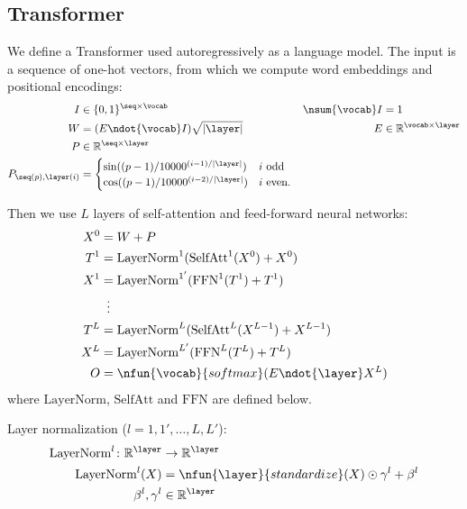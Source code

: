 \subsection{Transformer}
\label{sec:transformer}

We define a Transformer used autoregressively as a language model.
The input is a sequence of one-hot vectors, from which we compute word embeddings and positional encodings:
\begin{align*}
  I &\in \{0, 1\}^{\seq \times \vocab} & \nsum{\vocab} I &= 1 \\
  W &= (E \ndot{\vocab} I)\sqrt{|\layer|} & E &\in \reals^{\vocab \times \layer} \\
  P &\in \reals^{\seq \times \layer} \\
  P_{\seq(p), \layer(i)} &= \begin{cases}
    \sin((p-1) / 10000^{(i-1) / |\layer|}) & \text{$i$ odd} \\ 
    \cos((p-1) / 10000^{(i-2) / |\layer|}) & \text{$i$ even.}
  \end{cases}
\end{align*}

Then we use $L$ layers of self-attention and feed-forward neural networks:
\begin{align*} 
X^0 &= W+P \\
T^1 &= \text{LayerNorm}^1(\text{SelfAtt}^1(X^0) + X^0)\\
X^1 &= \text{LayerNorm}^{1'}(\text{FFN}^1(T^1) + T^1)\\
&\vdotswithin{=} \\
T^{L} &= \text{LayerNorm}^L(\text{SelfAtt}^L(X^{L-1}) + X^{L-1})\\
X^{L} &= \text{LayerNorm}^{L'}(\text{FFN}^L(T^L) + T^L)\\
O &= \nfun{\vocab}{softmax}(E \ndot{\layer} X^L)
\end{align*}
where $\text{LayerNorm}$, $\text{SelfAtt}$ and $\text{FFN}$ are defined below.

Layer normalization ($l = 1, 1', \ldots, L, L'$):
\begin{align*}
  \text{LayerNorm}^l \colon \reals^{\layer} &\rightarrow \reals^{\layer} \\
  \text{LayerNorm}^l(X) &= \nfun{\layer}{standardize}(X) \odot \gamma^l + \beta^l \\
  \beta^l, \gamma^l &\in \reals^{\layer}
\end{align*}

